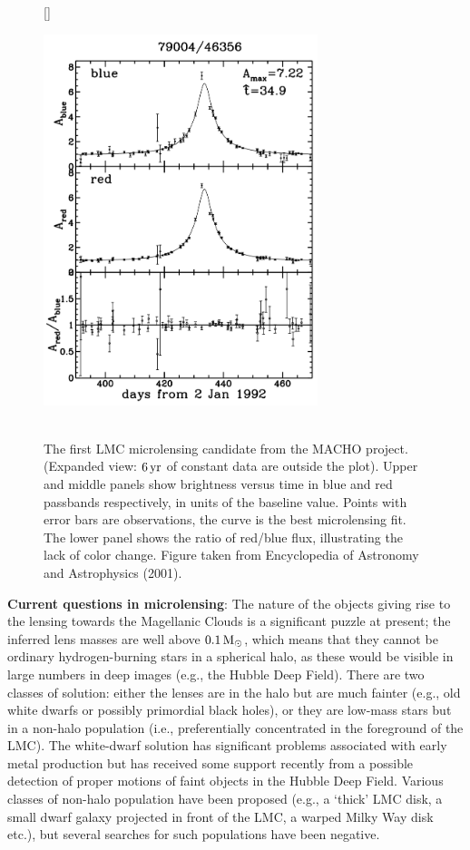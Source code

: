 \documentclass[a4paper,10pt]{article}
\begin{document}
\begin{figure}[t]
    [\FBwidth]
    {\caption{\footnotesize{\\The first LMC microlensing candidate from the MACHO project. (Expanded view: $6\,{\rm yr}$ of constant data are outside the plot). Upper and middle panels show brightness versus time in blue and red passbands respectively, in units of the baseline value. Points with error bars are observations, the curve is the best microlensing fit. The lower panel shows the ratio of red/blue flux, illustrating the lack of color change. Figure taken from Encyclopedia of Astronomy and Astrophysics (2001).}}
    \label{fig:microlensingcurve}}
    {\includegraphics[width=8cm]{figures/MicrolensingCurve.png}}
\end{figure}

{\noindent}\textbf{Current questions in microlensing}: The nature of the objects giving rise to the lensing towards the Magellanic Clouds is a significant puzzle at present; the inferred lens masses are well above $0.1\,{\rm M_\odot}$, which means that they cannot be ordinary hydrogen-burning stars in a spherical halo, as these would be visible in large numbers in deep images (e.g., the Hubble Deep Field). There are two classes of solution: either the lenses are in the halo but are much fainter (e.g., old white dwarfs or possibly primordial black holes), or they are low-mass stars but in a non-halo population (i.e., preferentially concentrated in the foreground of the LMC). The white-dwarf solution has significant problems associated with early metal production but has received some support recently from a possible detection of proper motions of faint objects in the Hubble Deep Field. Various classes of non-halo population have been proposed (e.g., a `thick' LMC disk, a small dwarf galaxy projected in front of the LMC, a warped Milky Way disk etc.), but several searches for such populations have been negative.
\end{document}

